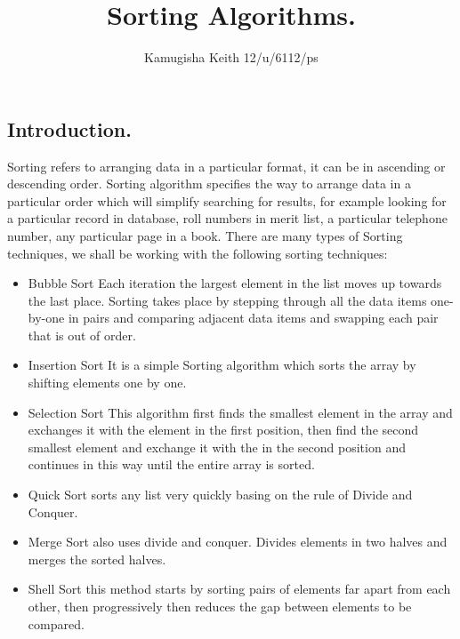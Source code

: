 \documentclass{article}
\title{Sorting Algorithms.}
\author{Kamugisha Keith 12/u/6112/ps}
\begin{document}
	
\subsection{Introduction.}
	Sorting refers to arranging data in a particular format, it can be in ascending or descending order. Sorting algorithm specifies the way to arrange data in a particular order which will simplify searching for results, for example looking for a particular record in database, roll numbers in merit list, a particular telephone number, any particular page in a book.
	There are many types of Sorting techniques, we shall be working with the following sorting techniques:
	\begin{itemize}
		\item 	Bubble Sort Each iteration the largest element in the list moves up towards the last place. Sorting takes place by stepping through all the data items one-by-one in pairs and comparing adjacent data items and swapping each pair that is out of order.
		\item Insertion Sort It is a simple Sorting algorithm which sorts the array by shifting elements one by one.
		\item Selection Sort This algorithm first finds the smallest element in the array and exchanges it with the element in the first position, then find the second smallest element and exchange it with the  in the second position and continues in this way until the entire array is sorted.
		\item Quick Sort sorts any list very quickly basing on the rule of Divide and Conquer.
		\item Merge Sort also uses divide and conquer. Divides elements in two halves and merges the sorted halves.
		\item Shell Sort this method starts by sorting pairs of elements far apart from each other, then progressively then reduces the gap between elements to be compared.
	\end{itemize}
	
\end{document}
